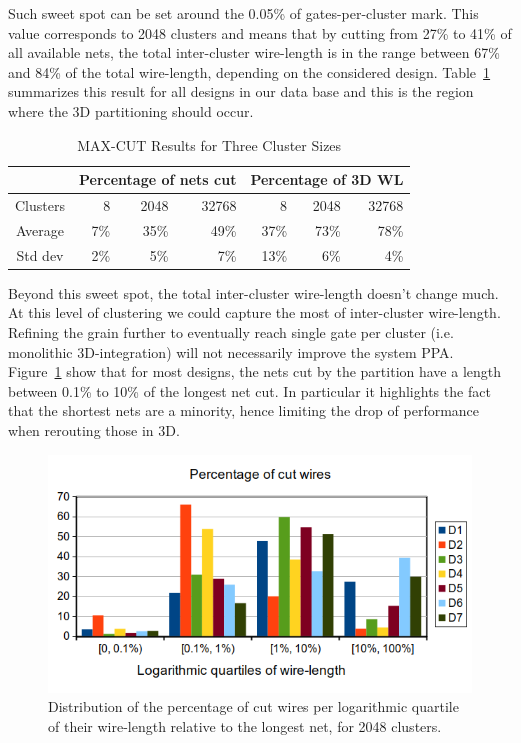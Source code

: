 \documentclass[conference]{IEEEtran}
\begin{document}
Such sweet spot can be set around the 0.05\% of gates-per-cluster mark. This value corresponds to 2048 clusters and means that by cutting from 27\% to 41\% of all available nets, the total inter-cluster wire-length is in the range between 67\% and 84\% of the total wire-length, depending on the considered design. Table~\ref{tab:res} summarizes this result for all designs in our data base and this is the region where the 3D partitioning should occur. 
\begin{table}[!t]
\renewcommand{\arraystretch}{1.25}
\caption{MAX-CUT Results for Three Cluster Sizes}
\label{tab:res}
\centering
\begin{tabular}{|c|r|r|r|r|r|r|}
\cline{2-7}
\multicolumn{1}{c|}{} & \multicolumn{3}{c|}{Percentage of nets cut} & \multicolumn{3}{c|}{Percentage of 3D WL}\\
\hline
\multicolumn{1}{|c|}{Clusters} & 8 & 2048 & 32768 & 8 & 2048 & 32768\\
\hline
Average & 7\% & 35\% & 49\% & 37\% & 73\% & 78\%\\
\hline
Std dev & 2\% & 5\% & 7\% & 13\% & 6\% & 4\%\\
\hline
\end{tabular}
\end{table}
Beyond this sweet spot, the total inter-cluster wire-length doesn't change much. At this level of clustering we could capture the most of inter-cluster wire-length. Refining the grain further to eventually reach single gate per cluster (i.e. monolithic 3D-integration) will not necessarily improve the system PPA.\\
Figure~\ref{fig:dits-wl-quart} show that for most designs, the nets cut by the partition have a length between 0.1\% to 10\% of the longest net cut. In particular it highlights the fact that the shortest nets are a minority, hence limiting the drop of performance when rerouting those in 3D.
\begin{figure}[!t]
\centering
\includegraphics[width=0.9\linewidth]{netCutWL_maxcut_all_log-quart_2048.png}
\caption{Distribution of the percentage of cut wires per logarithmic quartile of their wire-length relative to the longest net, for 2048 clusters.}
\label{fig:dits-wl-quart}
\end{figure}
\end{document}
